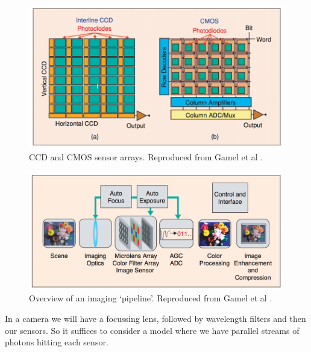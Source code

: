 \documentclass[12pt,twoside,notitlepage]{report}
\begin{document}
            \begin{figure}[H]
                \centering
                \includegraphics[scale=0.30]{sensor_arrays}
                \caption{CCD and CMOS sensor arrays. Reproduced from Gamel et al \cite{gamal2005cmos}.}
                \label{fig:image_pipeline}
            \end{figure}

            \begin{figure}[H]
                \centering
                \includegraphics[scale=0.30]{imaging_pipeline}
                \caption{Overview of an imaging `pipeline'. Reproduced from Gamel et al \cite{gamal2005cmos}.}
                \label{fig:image_pipeline}
            \end{figure}

            In a camera we will have a focussing lens, followed by wavelength filters and then our sensors. So it 
            suffices to consider a model where we have parallel streams of photons hitting each sensor.
\end{document}
